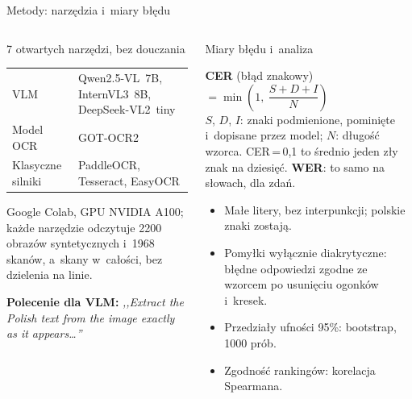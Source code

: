 \documentclass[aspectratio=169,11pt]{beamer}
\newenvironment{rowna}[1]{\vspace*{-0.5\baselineskip}\begin{minipage}[t][#1][t]{\linewidth}\vspace{0pt}\raggedright}{\end{minipage}}
\begin{document}
\begin{frame}{Metody: narzędzia i~miary błędu}
  \begin{columns}[t]
    \begin{column}{0.46\textwidth}
      \begin{block}{7 otwartych narzędzi, bez douczania\vphantom{y}}
        \begin{rowna}{5.3cm}
        \footnotesize
        \begin{tabular}[t]{@{}L{1.9cm}P{\dimexpr\linewidth-1.9cm-2\tabcolsep\relax}@{}}
          VLM & Qwen2.5-VL~7B, InternVL3~8B, DeepSeek-VL2~tiny \\[2pt]
          Model OCR & GOT-OCR2 \\[2pt]
          Klasyczne silniki & PaddleOCR, Tesseract, EasyOCR
        \end{tabular}

        \medskip
        Google Colab, GPU NVIDIA A100; każde narzędzie odczytuje 2200 obrazów syntetycznych i~1968 skanów,
        a~skany w~całości, bez dzielenia na linie.

        \medskip
        \textbf{Polecenie dla VLM:} \emph{,,Extract the Polish text from the image exactly as it appears\ldots''}
        \end{rowna}
      \end{block}
    \end{column}
    \begin{column}{0.51\textwidth}
      \begin{block}{Miary błędu i~analiza}
        \begin{rowna}{5.3cm}
        \footnotesize
        \textbf{CER} (błąd znakowy) $=\min\left(1,\ \dfrac{S+D+I}{N}\right)$\\[2pt]
        $S$, $D$, $I$: znaki podmienione, pominięte i~dopisane przez model; $N$: długość wzorca.
        CER\,=\,0,1 to średnio jeden zły znak na dziesięć. \textbf{WER}: to samo na słowach, dla zdań.

        \setlength{\leftmargini}{1.1em}
        \begin{itemize}
          \setlength{\itemsep}{0pt}
          \item Małe litery, bez interpunkcji; polskie znaki zostają.
          \item Pomyłki wyłącznie diakrytyczne: błędne odpowiedzi zgodne ze wzorcem po usunięciu ogonków i~kresek.
          \item Przedziały ufności 95\%: bootstrap, 1000 prób.
          \item Zgodność rankingów: korelacja Spearmana.
        \end{itemize}
        \end{rowna}
      \end{block}
    \end{column}
  \end{columns}
\end{frame}
\end{document}
